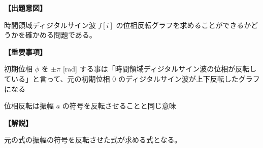 \noindent \textbf{【出題意図】}

\noindent 時間領域ディジタルサイン波 $f[i]$ の位相反転グラフを求めることができるかどうかを確かめる問題である。

\vspace{1em}
\noindent \textbf{【重要事項】}

\bigskip
\noindent  初期位相 $\phi$ を $\pm\pi$ [rad] する事は「時間領域ディジタルサイン波の位相が反転している」と言って、元の初期位相 $0$ のディジタルサイン波が上下反転したグラフになる

\bigskip
\noindent  位相反転は振幅 $a$ の符号を反転させることと同じ意味


\vspace{1em}
\noindent \textbf{【解説】}

\noindent 元の式の振幅の符号を反転させた式が求める式となる。
